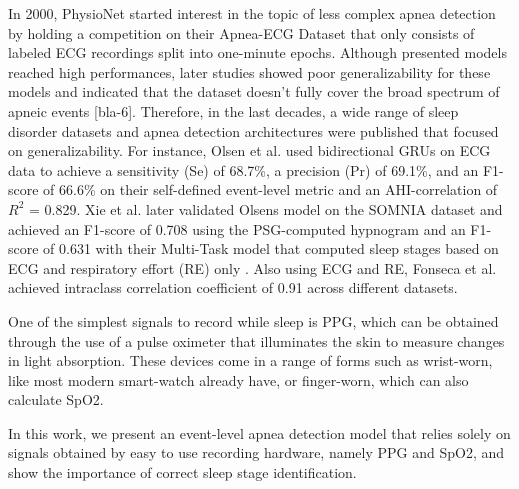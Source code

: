 In 2000, PhysioNet started interest in the topic of less complex apnea
 detection by holding a competition on their Apnea-ECG Dataset that
 only consists of labeled ECG recordings split into one-minute epochs.
 Although presented models reached high performances, later studies showed
 poor generalizability for these models and indicated that the dataset
 doesn't fully cover the broad spectrum of apneic events [bla-6]. Therefore,
 in the last decades, a wide range of sleep disorder datasets and apnea
 detection architectures were published that focused on generalizability.
For instance, Olsen et al. \cite{olsen2020robust} used bidirectional GRUs
 on ECG data to achieve a sensitivity (Se) of 68.7\%, a precision (Pr)
 of 69.1\%, and an F1-score of 66.6\% on their self-defined event-level
 metric and an AHI-correlation of $R^2$ = 0.829. Xie et al. \cite{xie2023use}
 later validated Olsens model on the SOMNIA dataset and achieved an
 F1-score of 0.708 using the PSG-computed hypnogram and an F1-score of
 0.631 with their Multi-Task model that computed sleep stages based on
 ECG and respiratory effort (RE) only \cite{xie2024multi}. Also using 
 ECG and RE, Fonseca et al. \cite{fonseca2024estimating} achieved intraclass
 correlation coefficient of 0.91 across different datasets.

One of the simplest signals to record while sleep is PPG, which can be
 obtained through the use of a pulse oximeter that illuminates the skin
 to measure changes in light absorption.
These devices come in a range of forms such as wrist-worn, like most
 modern smart-watch already have, or finger-worn, which can also
 calculate SpO2.

In this work, we present an event-level apnea detection model that relies
 solely on signals obtained by easy to use recording hardware, namely
 PPG and SpO2, and show the importance of correct sleep stage identification.

